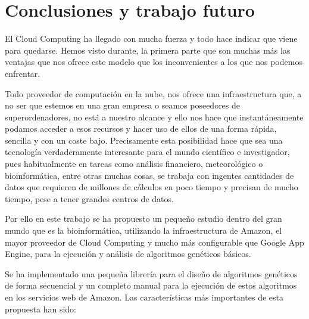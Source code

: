 \documentclass[runningheads]{llncs}
\begin{document}
\section{Conclusiones y trabajo futuro}
\label{sec:conc}




El Cloud Computing ha llegado con mucha fuerza y todo hace indicar que viene para quedarse.  Hemos visto durante, 
la primera parte que son muchas más las ventajas que nos ofrece este modelo que los inconvenientes a los que nos podemos 
enfrentar.  

Todo proveedor de computación en la nube, nos ofrece una infraestructura que, a no ser que estemos en una gran empresa o 
seamos poseedores de superordenadores, no está a nuestro alcance y ello nos hace que instantáneamente podamos acceder 
a esos recursos y hacer uso de ellos de una forma rápida, sencilla y con un coste bajo.  Precisamente esta posibilidad hace que 
sea una tecnología verdaderamente interesante para el mundo científico e investigador, pues habitualmente en tareas como 
análisis financiero, meteorológico o bioinformática, entre otras muchas cosas, se trabaja con ingentes cantidades de datos 
que requieren de millones de cálculos en poco tiempo y precisan de mucho tiempo, pese a tener grandes centros de datos. 

Por ello en este trabajo se ha propuesto un pequeño estudio dentro del gran mundo que es la bioinformática, utilizando 
la infraestructura de Amazon, el mayor proveedor de Cloud Computing y mucho más configurable que Google App Engine,
para la ejecución y análisis de algoritmos genéticos básicos.  

Se ha implementado una pequeña librería para el diseño de algoritmos genéticos de forma secuencial y un completo manual para 
la ejecución de estos algoritmos en los servicios web de Amazon.  Las características más importantes de esta propuesta han sido:
\end{document}
